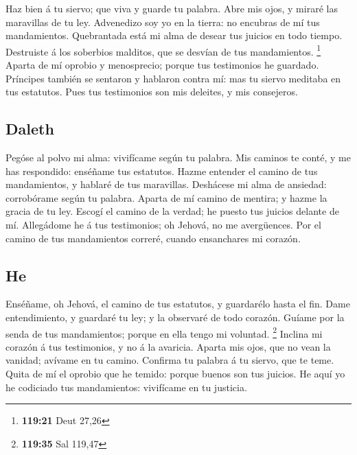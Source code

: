  Haz bien á tu siervo; que viva y guarde tu palabra.
 Abre mis ojos, y miraré las maravillas de tu ley.
 Advenedizo soy yo en la tierra: no encubras de mí tus
mandamientos.  Quebrantada está mi alma de desear tus
juicios en todo tiempo.  Destruiste á los soberbios
malditos, que se desvían de tus mandamientos. \footnote{\textbf{119:21}
  Deut 27,26}  Aparta de mí oprobio y menosprecio; porque
tus testimonios he guardado.  Príncipes también se sentaron
y hablaron contra mí: mas tu siervo meditaba en tus estatutos.
 Pues tus testimonios son mis deleites, y mis consejeros.

\hypertarget{daleth}{%
\subsection{Daleth}\label{daleth}}

 Pegóse al polvo mi alma: vivifícame según tu palabra.
 Mis caminos te conté, y me has respondido: enséñame tus
estatutos.  Hazme entender el camino de tus mandamientos, y
hablaré de tus maravillas.  Deshácese mi alma de ansiedad:
corrobórame según tu palabra.  Aparta de mí camino de
mentira; y hazme la gracia de tu ley.  Escogí el camino de
la verdad; he puesto tus juicios delante de mí.  Allegádome
he á tus testimonios; oh Jehová, no me avergüences.  Por el
camino de tus mandamientos correré, cuando ensanchares mi corazón.

\hypertarget{he}{%
\subsection{He}\label{he}}

 Enséñame, oh Jehová, el camino de tus estatutos, y
guardarélo hasta el fin.  Dame entendimiento, y guardaré tu
ley; y la observaré de todo corazón.  Guíame por la senda
de tus mandamientos; porque en ella tengo mi voluntad. \footnote{\textbf{119:35}
  Sal 119,47}  Inclina mi corazón á tus testimonios, y no á
la avaricia.  Aparta mis ojos, que no vean la vanidad;
avívame en tu camino.  Confirma tu palabra á tu siervo, que
te teme.  Quita de mí el oprobio que he temido: porque
buenos son tus juicios.  He aquí yo he codiciado tus
mandamientos: vivifícame en tu justicia.

